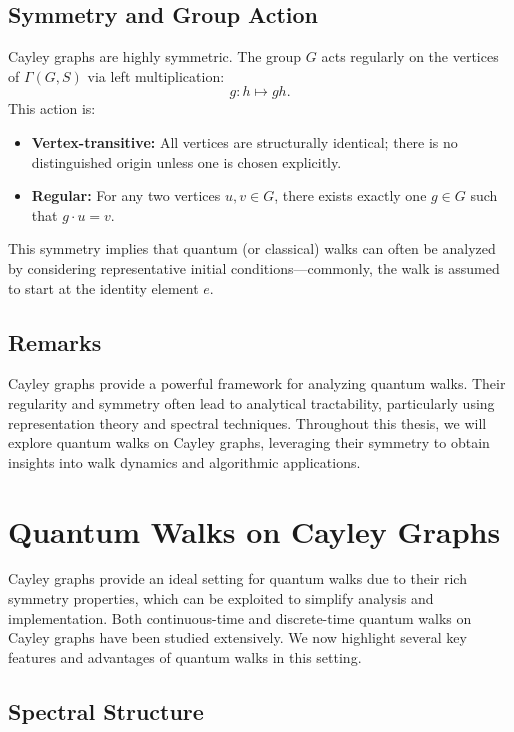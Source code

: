 \documentclass[12pt]{report}
\begin{document}
\subsection{Symmetry and Group Action}

Cayley graphs are highly symmetric. The group $G$ acts regularly on the vertices of $\Gamma(G, S)$ via left multiplication:
\[
g : h \mapsto gh.
\]
This action is:
\begin{itemize}
    \item \textbf{Vertex-transitive:} All vertices are structurally identical; there is no distinguished origin unless one is chosen explicitly.
    \item \textbf{Regular:} For any two vertices $u, v \in G$, there exists exactly one $g \in G$ such that $g \cdot u = v$.
\end{itemize}

This symmetry implies that quantum (or classical) walks can often be analyzed by considering representative initial conditions—commonly, the walk is assumed to start at the identity element $e$.

\subsection{Remarks}

Cayley graphs provide a powerful framework for analyzing quantum walks. Their regularity and symmetry often lead to analytical tractability, particularly using representation theory and spectral techniques. Throughout this thesis, we will explore quantum walks on Cayley graphs, leveraging their symmetry to obtain insights into walk dynamics and algorithmic applications.







\section{Quantum Walks on Cayley Graphs}


Cayley graphs provide an ideal setting for quantum walks due to their rich symmetry properties, which can be exploited to simplify analysis and implementation. Both continuous-time and discrete-time quantum walks on Cayley graphs have been studied extensively. We now highlight several key features and advantages of quantum walks in this setting.


\subsection{Spectral Structure}
\end{document}
